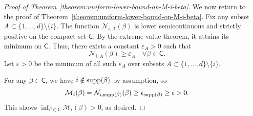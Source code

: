 \documentclass[sn-mathphys-num]{sn-jnl}%
\numberwithin{equation}{section}
\newcommand{\R}{\mathbb{R}}
\newcommand{\E}{\mathbb{E}}
\newcommand{\norm}[1]{\left\|{#1}\right\|} %
\newtheorem{lemma}{Lemma}
\newcommand{\eps}{\epsilon}
\newcommand{\profile}{\psi}
\newcommand{\supp}{\mathop{\rm supp}}
\theoremstyle{thmstyleone}%
\newtheorem{theorem}{Theorem}%
\theoremstyle{thmstyletwo}%
\theoremstyle{thmstylethree}%
\begin{document}
\begin{proof}[Proof of Theorem~\ref{theorem:uniform-lower-bound-on-M-i-beta}]

We now return to the proof of Theorem~\ref{theorem:uniform-lower-bound-on-M-i-beta}. Fix any subset 
$A \subset \{1, \dots, d\} \setminus \{i\}$.  The function $\mathcal{N}_{i, A}(\beta)$ is lower semicontinuous 
and  strictly positive on the compact set $\mathsf{C}$. By the extreme value theorem, it attains its minimum
on $\mathsf{C}$. Thus, there exists a constant $\varepsilon_A > 0$ such that
\[
\mathcal{N}_{i, A}(\beta) \ge \varepsilon_A \quad \forall \beta \in \mathsf{C}.
\]
Let $\varepsilon > 0$ be the minimum of all such $\varepsilon_A$ over subsets $A \subset \{1, \dots, d\} \setminus \{i\}$. 

For any $\beta \in \mathsf{C}$, we have $i \notin \supp(\beta)$ by assumption, so
\begin{equation*}
	\mathcal{M}_i(\beta) = \mathcal{N}_{i, \supp(\beta)}(\beta) \ge \eps_{\supp(\beta)} \ge \eps > 0.
\end{equation*}
This shows $\inf_{\beta \in \mathsf{C}} \mathcal{M}_i(\beta)  > 0$, as desired.
%
%
%


\end{proof}
\end{document}

